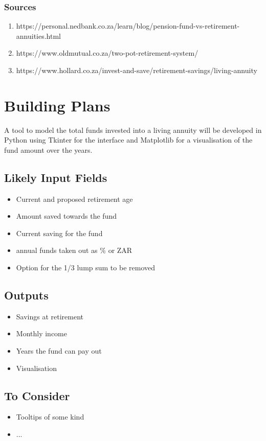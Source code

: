 \documentclass[a4paper, 11pt]{article}
\begin{document}
\subsubsection*{Sources}
\begin{enumerate}
\item https://personal.nedbank.co.za/learn/blog/pension-fund-vs-retirement-annuities.html
\item https://www.oldmutual.co.za/two-pot-retirement-system/
\item https://www.hollard.co.za/invest-and-save/retirement-savings/living-annuity
\end{enumerate}

\newpage
\section*{Building Plans}
A tool to model the total funds invested into a living annuity will be developed in Python using Tkinter for the interface and Matplotlib for a visualisation of the fund amount over the years.

\subsection*{Likely Input Fields}
\begin{itemize}
\item Current and proposed retirement age
\item Amount saved towards the fund
\item Current saving for the fund
\item annual funds taken out as \% or ZAR
\item Option for the 1/3 lump sum to be removed
\end{itemize}

\subsection*{Outputs}
\begin{itemize}
\item Savings at retirement
\item Monthly income
\item Years the fund can pay out
\item Visualisation
\end{itemize}

\subsection*{To Consider}
\begin{itemize}
\item Tooltips of some kind
\item ...
\end{itemize}
\end{document}
